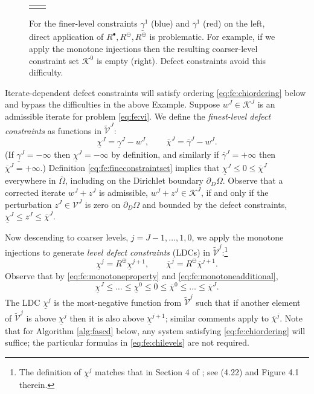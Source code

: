 \documentclass[review,hidelinks,onefignum,onetabnum]{siamart220329}
\newcommand{\cK}{\mathcal{K}}
\newcommand{\maxR}{R^{\bm{\oplus}}}
\newcommand{\minR}{R^{\bm{\ominus}}}
\newcommand{\iR}{R^{\bullet}}
\begin{document}
\begin{figure}[ht]
\centering
\begin{tabular}{cc}

&

\end{tabular}
\caption{For the finer-level constraints $\underline{\gamma}^1$ (blue) and $\overline{\gamma}^1$ (red) on the left, direct application of $\iR,\minR,\maxR$ is problematic.  For example, if we apply the monotone injections then the resulting coarser-level constraint set $\mathcal{K}^0$ is empty (right).  Defect constraints avoid this difficulty.}
\label{fig:directRbad}
\end{figure}

Iterate-dependent defect constraints will satisfy ordering \eqref{eq:fe:chiordering} below and bypass the difficulties in the above Example.  Suppose $w^J \in \cK^J$ is an admissible iterate for problem \eqref{eq:fe:vi}.  We define the \emph{finest-level defect constraints} \cite{GraeserKornhuber2009} as functions in $\tilde{\mathcal{V}}^J$:
\begin{equation}
\underline{\chi}^J = \underline{\gamma}^J - w^J, \qquad \overline{\chi}^J = \overline{\gamma}^J - w^J. \label{eq:fe:defectconstraints}
\end{equation}
(If $\underline{\gamma}^J=-\infty$ then $\underline{\chi}^J=-\infty$ by definition, and similarly if $\overline{\gamma}^J=+\infty$ then $\overline{\chi}^J=+\infty$.)  Definition \eqref{eq:fe:fineconstraintset} implies that $\underline{\chi}^J \le 0 \le \overline{\chi}^J$ everywhere in $\overline{\Omega}$, including on the Dirichlet boundary $\partial_D\Omega$.    Observe that a corrected iterate $w^J + z^J$ is admissible, $w^J + z^J \in \cK^J$, if and only if the perturbation $z^J \in \mathcal{V}^J$ is zero on $\partial_D\Omega$ and bounded by the defect constraints, $\underline{\chi}^J \le z^J \le \overline{\chi}^J$.

Now descending to coarser levels, $j=J-1,\dots,1,0$, we apply the monotone injections to generate \emph{level defect constraints} (LDCs) in $\tilde{\mathcal{V}}^j$:\footnote{The definition of $\underline{\chi}^j$ matches that in Section 4 of \cite{GraeserKornhuber2009}; see (4.22) and Figure 4.1 therein.}
\begin{equation}
\underline{\chi}^{j} = \maxR \underline{\chi}^{j+1}, \qquad \overline{\chi}^{j} = \minR \overline{\chi}^{j+1}. \label{eq:fe:chilevels}
\end{equation}
Observe that by \eqref{eq:fe:monotoneproperty} and \eqref{eq:fe:monotoneadditional},
\begin{equation}
\underline{\chi}^{J} \le \dots \le \underline{\chi}^0 \le 0 \le \overline{\chi}^0 \le \dots \le \overline{\chi}^J. \label{eq:fe:chiordering}
\end{equation}
The LDC $\underline{\chi}^j$ is the most-negative function from $\tilde{\mathcal{V}}^j$ such that if another element of $\tilde{\mathcal{V}}^j$ is above $\underline{\chi}^j$ then it is also above $\underline{\chi}^{j+1}$; similar comments apply to $\overline{\chi}^{j}$.  Note that for Algorithm \ref{alg:fascd} below, any system satisfying \eqref{eq:fe:chiordering} will suffice; the particular formulas in \eqref{eq:fe:chilevels} are not required.
\end{document}
